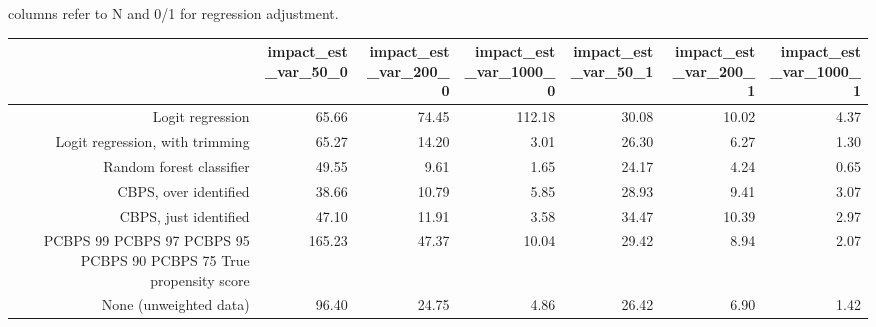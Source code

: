 columns refer to N and 0/1 for regression adjustment.
\begin{center}
\begin{tabular}{rrrrrrr}
\hline  & impact_est_var_50_0 & impact_est_var_200_0 & impact_est_var_1000_0 & impact_est_var_50_1 & impact_est_var_200_1 & impact_est_var_1000_1\\
\hline Logit regression & 65.66 & 74.45 & 112.18 & 30.08 & 10.02 & 4.37\\
Logit regression, with trimming & 65.27 & 14.20 & 3.01 & 26.30 & 6.27 & 1.30\\
Random forest classifier & 49.55 & 9.61 & 1.65 & 24.17 & 4.24 & 0.65\\
CBPS, over identified & 38.66 & 10.79 & 5.85 & 28.93 & 9.41 & 3.07\\
CBPS, just identified & 47.10 & 11.91 & 3.58 & 34.47 & 10.39 & 2.97\\
PCBPS 99%
PCBPS 97%
PCBPS 95%
PCBPS 90%
PCBPS 75%
True propensity score & 165.23 & 47.37 & 10.04 & 29.42 & 8.94 & 2.07\\
None (unweighted data) & 96.40 & 24.75 & 4.86 & 26.42 & 6.90 & 1.42\\
\hline\end{tabular}\\
\end{center}

